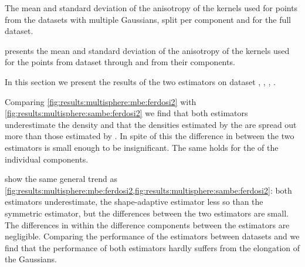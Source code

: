 	\begin{table*}
		\centering
		
		\caption{The mean and standard deviation of the anisotropy of the kernels used for points from the datasets with multiple Gaussians, split per component and for the full dataset.} 	
		\label{tab:results:multiSphere:anisotropy}
	\end{table*}
	 presents the mean and standard deviation of the anisotropy of the kernels used for the points from dataset \ferdosiTwo through \baakmanThree and from their components. 















\oldStuff

	In this section we present the results of the two estimators on dataset \ferdosiTwo, \baakmanTwo, \ferdosiThree, \baakmanThree.

	Comparing \cref{fig:results:multisphere:mbe:ferdosi2} with \cref{fig:results:multisphere:sambe:ferdosi2} we find that both estimators underestimate the density and that the densities estimated by the \sambe are spread out more than those estimated by \mbe. In spite of this the difference in \mse between the two estimators is small enough to be insignificant. 
	The same holds for the \mse of the individual components.

	 show the same general trend as \cref{fig:results:multisphere:mbe:ferdosi2,fig:results:multisphere:sambe:ferdosi2}: both estimators underestimate, the shape-adaptive estimator less so than the symmetric estimator, but the differences between the two estimators are small. 
	The differences in \MSE within the difference components between the estimators are negligible. 
	Comparing the performance of the estimators between datasets \ferdosiTwo and \baakmanTwo we find that the performance of both estimators hardly suffers from the elongation of the Gaussians. 

